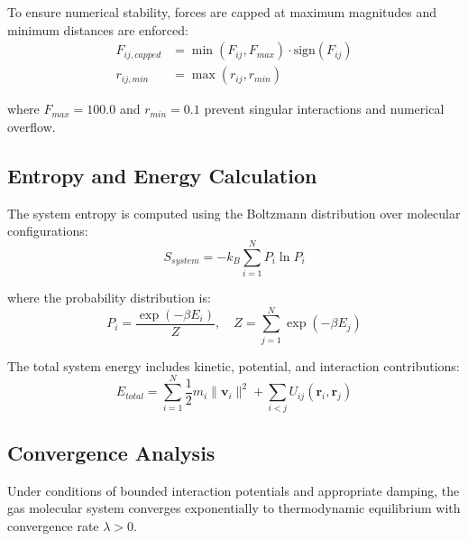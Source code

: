 To ensure numerical stability, forces are capped at maximum magnitudes and minimum distances are enforced:
\begin{align}
F_{ij,capped} &= \min(F_{ij}, F_{max}) \cdot \text{sign}(F_{ij}) \label{eq:force-capping} \\
r_{ij,min} &= \max(r_{ij}, r_{min}) \label{eq:minimum-distance}
\end{align}

where $F_{max} = 100.0$ and $r_{min} = 0.1$ prevent singular interactions and numerical overflow.

\subsection{Entropy and Energy Calculation}

The system entropy is computed using the Boltzmann distribution over molecular configurations:
\begin{equation}
S_{system} = -k_B \sum_{i=1}^{N} P_i \ln P_i
\label{eq:system-entropy}
\end{equation}

where the probability distribution is:
\begin{equation}
P_i = \frac{\exp(-\beta E_i)}{Z}, \quad Z = \sum_{j=1}^{N} \exp(-\beta E_j)
\label{eq:boltzmann-distribution}
\end{equation}

The total system energy includes kinetic, potential, and interaction contributions:
\begin{equation}
E_{total} = \sum_{i=1}^{N} \frac{1}{2} m_i \|\mathbf{v}_i\|^2 + \sum_{i<j} U_{ij}(\mathbf{r}_i, \mathbf{r}_j)
\label{eq:total-energy}
\end{equation}

\subsection{Convergence Analysis}

\begin{theorem}
Under conditions of bounded interaction potentials and appropriate damping, the gas molecular system converges exponentially to thermodynamic equilibrium with convergence rate $\lambda > 0$.
\end{theorem}

